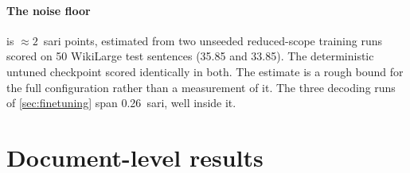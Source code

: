 \paragraph{The noise floor} is \({\approx}2\)~\gls{sari} points, estimated from two unseeded reduced-scope training runs scored on 50 WikiLarge test sentences (\num{35.85} and \num{33.85}).
The deterministic untuned checkpoint scored identically in both.
The estimate is a rough bound for the full configuration rather than a measurement of it.
The three decoding runs of \cref{sec:finetuning} span \num{0.26}~\gls{sari}, well inside it.

\section{Document-level results}
\label{sec:document-results}


